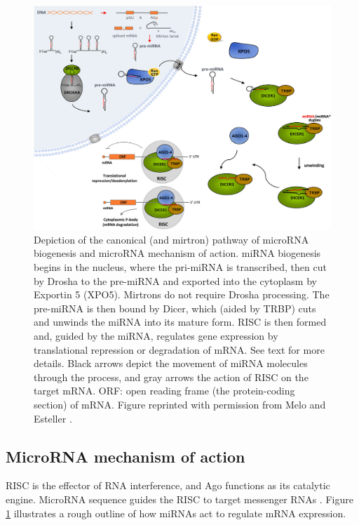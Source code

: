 \begin{figure}[htb]
  \centering
  \includegraphics[width=1\linewidth]{figures/miRNA_biogenesis.png}
  \caption{Depiction of the canonical (and mirtron) pathway of microRNA biogenesis
  and microRNA mechanism of action. miRNA biogenesis begins in the nucleus, where
  the pri-miRNA is transcribed, then cut by Drosha to the pre-miRNA and exported
  into the cytoplasm by Exportin 5 (XPO5). Mirtrons do not require Drosha processing.
  The pre-miRNA is then bound by Dicer, which (aided by TRBP) cuts and unwinds the miRNA into
  its mature form. RISC is then formed and, guided by the miRNA, regulates gene expression by translational
  repression or degradation of mRNA. See text for more details.
  Black arrows depict the movement of miRNA molecules through the process, and
  gray arrows the action of RISC on the target mRNA.
  ORF: open reading frame (the protein-coding section) of mRNA.
  Figure reprinted with permission from Melo and Esteller \citep{Melo2011}.}
  \label{fig:mirna-biogenesis}
\end{figure}




\subsection{MicroRNA mechanism of action}\label{microrna-mechanism}

RISC is the effector of RNA interference, and Ago functions as its catalytic
engine. MicroRNA sequence guides the RISC to target messenger RNAs
\citep{Filipowicz2008}. Figure \ref{fig:mirna-biogenesis} illustrates a rough
outline of how miRNAs act to regulate mRNA expression.

